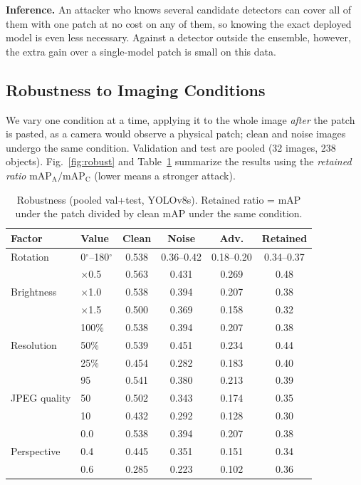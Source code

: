 \documentclass[conference]{IEEEtran}
\begin{document}
\textbf{Inference.} An attacker who knows several candidate detectors can cover all of them
with one patch at no cost on any of them, so knowing the exact deployed model is even less
necessary. Against a detector outside the ensemble, however, the extra gain over a
single-model patch is small on this data.

\subsection{Robustness to Imaging Conditions}
\label{sec:robust}
We vary one condition at a time, applying it to the whole image \emph{after} the patch is
pasted, as a camera would observe a physical patch; clean and noise images undergo the same
condition. Validation and test are pooled (32 images, 238 objects). Fig.~\ref{fig:robust}
and Table~\ref{tab:robust} summarize the results using the \emph{retained ratio}
$\text{mAP}_{\text{A}}/\text{mAP}_{\text{C}}$ (lower means a stronger attack).

\begin{table}[t]
\centering
\caption{Robustness (pooled val+test, YOLOv8s). Retained ratio = mAP under the patch divided
by clean mAP under the same condition.}
\label{tab:robust}
\setlength{\tabcolsep}{3.5pt}
\begin{tabular}{llcccc}
\toprule
Factor & Value & Clean & Noise & Adv. & Retained \\
\midrule
Rotation & 0$^\circ$--180$^\circ$ & 0.538 & 0.36--0.42 & 0.18--0.20 & 0.34--0.37 \\
\midrule
\multirow{3}{*}{Brightness} & $\times$0.5 & 0.563 & 0.431 & 0.269 & 0.48 \\
 & $\times$1.0 & 0.538 & 0.394 & 0.207 & 0.38 \\
 & $\times$1.5 & 0.500 & 0.369 & 0.158 & 0.32 \\
\midrule
\multirow{3}{*}{Resolution} & 100\% & 0.538 & 0.394 & 0.207 & 0.38 \\
 & 50\% & 0.539 & 0.451 & 0.234 & 0.44 \\
 & 25\% & 0.454 & 0.282 & 0.183 & 0.40 \\
\midrule
\multirow{3}{*}{JPEG quality} & 95 & 0.541 & 0.380 & 0.213 & 0.39 \\
 & 50 & 0.502 & 0.343 & 0.174 & 0.35 \\
 & 10 & 0.432 & 0.292 & 0.128 & 0.30 \\
\midrule
\multirow{3}{*}{Perspective} & 0.0 & 0.538 & 0.394 & 0.207 & 0.38 \\
 & 0.4 & 0.445 & 0.351 & 0.151 & 0.34 \\
 & 0.6 & 0.285 & 0.223 & 0.102 & 0.36 \\
\bottomrule
\end{tabular}
\end{table}
\end{document}
